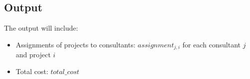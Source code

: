 \documentclass{article}
\begin{document}
\subsection*{Output}
The output will include:
\begin{itemize}
    \item Assignments of projects to consultants: $assignment_{j,i}$ for each consultant $j$ and project $i$
    \item Total cost: $total\_cost$
\end{itemize}
\end{document}

